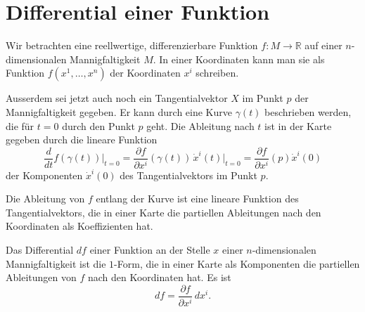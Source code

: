 %
%
\section{Differential einer Funktion}
%
Wir betrachten eine reellwertige, differenzierbare Funktion
$f\colon M\to\mathbb{R}$ auf einer $n$-dimensionalen 
Mannigfaltigkeit $M$.
In einer Koordinaten kann man sie als Funktion 
$f(x^1,\dots,x^n)$ der Koordinaten $x^i$ schreiben.

Ausserdem sei jetzt auch noch ein Tangentialvektor $X$ im Punkt
$p$ der Mannigfaltigkeit gegeben.
Er kann durch eine Kurve $\gamma(t)$ beschrieben werden, die
für $t=0$ durch den Punkt $p$ geht.
Die Ableitung nach $t$ ist in der Karte gegeben durch die
lineare Funktion
\[
\frac{d}{dt}
f(\gamma(t))
\bigg|_{t=0}
=
\frac{\partial f}{\partial x^i}(\gamma(t))\,\dot{x}^i(t)\bigg|_{t=0}
=
\frac{\partial f}{\partial x^i}(p)\dot{x}^i(0)
\]
der Komponenten $\dot{x}^i(0)$ des Tangentialvektors im Punkt $p$.

Die Ableitung von $f$ entlang der Kurve ist eine lineare 
Funktion des Tangentialvektors, die in einer Karte die
partiellen Ableitungen nach den Koordinaten als Koeffizienten
hat.

\begin{definition}
\label{buch:kurvenintegral:differential:def:differential}
%
Das Differential $df$ einer Funktion an der Stelle $x$ einer
$n$-dimensionalen Mannigfaltigkeit ist die $1$-Form, die in einer
Karte als Komponenten die partiellen Ableitungen von $f$ nach den
Koordinaten hat.
Es ist
\[
df
=
\frac{\partial f}{\partial x^i}\,dx^i.
\]
\end{definition}

%
%
